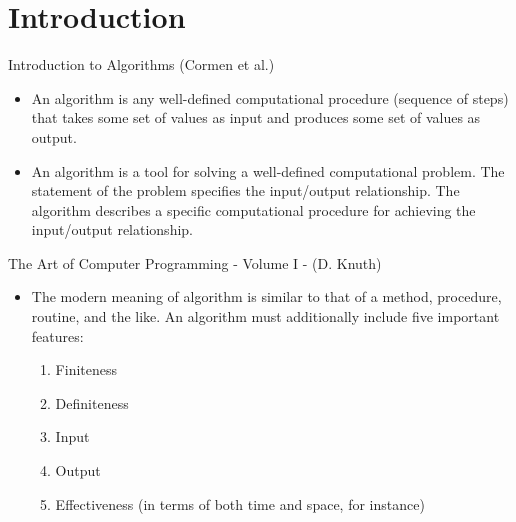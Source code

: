 \section{Introduction}

\begin{frame}

  \begin{block}{Introduction to Algorithms (Cormen et al.)}
  \begin{itemize}
    \item An algorithm is any well-defined computational procedure (sequence of
    steps) that takes some set of values as input and produces some set of values
    as output. \pause

  \item An algorithm is a tool for solving a well-defined computational problem. The
    statement of the problem specifies the input/output relationship. The
    algorithm describes a specific computational procedure for achieving the
    input/output relationship.
  \end{itemize}
  \end{block}

  
  
\end{frame}

\begin{frame}

  \begin{block}{The Art of Computer Programming - Volume I - (D. Knuth)}
    \begin{itemize}
      \item The modern meaning of algorithm is similar to that of
      a method, procedure, routine, and the like. \pause An algorithm must
      additionally include five important features\pause:

      \begin{enumerate}
       \item Finiteness
       \item Definiteness
       \item Input
       \item Output
       \item Effectiveness \pause(in terms of both time and space, for instance)  
      \end{enumerate}
   \end{itemize}   
  \end{block}  
\end{frame}

